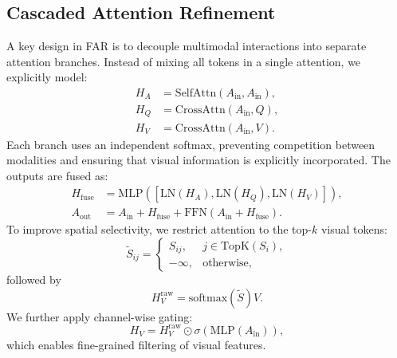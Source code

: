 \documentclass[conference]{IEEEtran}
\begin{document}
\subsection{Cascaded Attention Refinement}
A key design in FAR is to decouple multimodal interactions into separate attention branches. Instead of mixing all tokens in a single attention, we explicitly model:
\begin{align}
H_A &= \text{SelfAttn}(A_{\text{in}}, A_{\text{in}}), \\
H_Q &= \text{CrossAttn}(A_{\text{in}}, Q), \\
H_V &= \text{CrossAttn}(A_{\text{in}}, V).
\end{align}
Each branch uses an independent softmax, preventing competition between modalities and ensuring that visual information is explicitly incorporated.
The outputs are fused as:
\begin{align}
H_{\text{fuse}} &= \text{MLP}([\text{LN}(H_A), \text{LN}(H_Q), \text{LN}(H_V)]), \\
A_{\text{out}} &= A_{\text{in}} + H_{\text{fuse}} + \text{FFN}(A_{\text{in}} + H_{\text{fuse}}).
\end{align}
To improve spatial selectivity, we restrict attention to the top-$k$ visual tokens:
\begin{equation}
\tilde{S}_{ij} =
\begin{cases}
S_{ij}, & j \in \text{TopK}(S_i), \\
-\infty, & \text{otherwise},
\end{cases}
\end{equation}
followed by
\begin{equation}
H_V^{\text{raw}} = \text{softmax}(\tilde{S}) V.
\end{equation}
We further apply channel-wise gating:
\begin{equation}
H_V = H_V^{\text{raw}} \odot \sigma(\text{MLP}(A_{\text{in}})),
\end{equation}
which enables fine-grained filtering of visual features.
\end{document}
